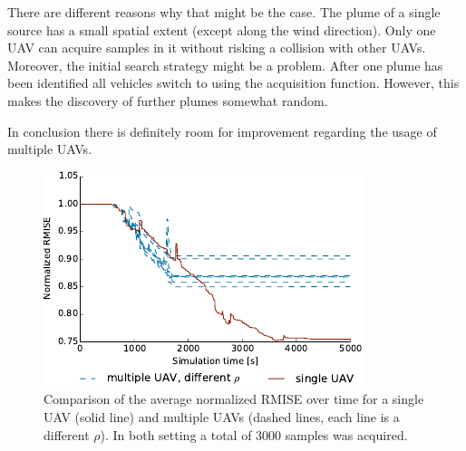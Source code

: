 There are different reasons why that might be the case. The plume of a single 
source has a small spatial extent (except along the wind direction). Only one 
UAV can acquire samples in it without risking a collision with other UAVs.  
Moreover, the initial search strategy might be a problem. After one plume has 
been identified all vehicles switch to using the acquisition function. However, 
this makes the discovery of further plumes somewhat random.

In conclusion there is definitely room for improvement regarding the usage of 
multiple UAVs.

\begin{figure}
    \centering
    \includegraphics{plots/sv-vs-mv}
    \caption[Comparing the usage of a single and multiple UAVs.]{Comparison of 
        the average normalized RMISE over time for a single UAV (solid line) and 
        multiple UAVs (dashed lines, each line is a different $\rho$). In both 
        setting a total of \num{3000} samples was acquired.}\label{fig:sv-vs-mv}
\end{figure}
